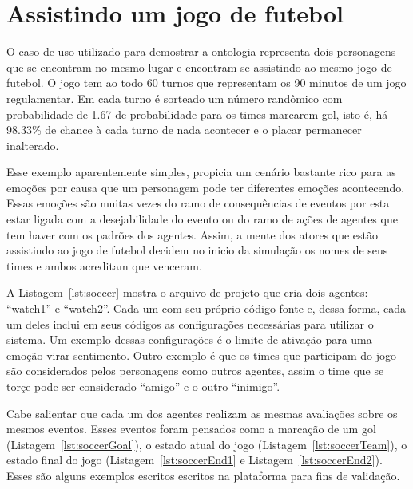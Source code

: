 \section{Assistindo um jogo de futebol} \label{ch:cdu:svc}

O caso de uso utilizado para demostrar a ontologia representa dois personagens
que se encontram no mesmo lugar e encontram-se assistindo ao mesmo jogo de
futebol. O jogo tem ao todo 60 turnos que representam os 90 minutos de um jogo
regulamentar. Em cada turno é sorteado um número randômico com probabilidade
de 1.67 de probabilidade para os times marcarem gol, isto é, há 98.33\% de
chance à cada turno de nada acontecer e o placar permanecer inalterado.

Esse exemplo aparentemente simples, propicia um cenário bastante rico para as
emoções por causa que um personagem pode ter diferentes emoções acontecendo.
Essas emoções são muitas vezes do ramo de consequências de eventos por esta
estar ligada com a desejabilidade do evento ou do ramo de ações de agentes que
tem haver com os padrões dos agentes. Assim, a mente dos atores que estão
assistindo ao jogo de futebol decidem no inicio da simulação os nomes de seus
times e ambos acreditam que venceram.

\begin{center}
    \begin{minipage}{140mm}
	\lstset{linewidth=140mm}
	
    \end{minipage}
\end{center}

A Listagem~\ref{lst:soccer} mostra o arquivo de projeto que cria dois agentes:
``watch1'' e ``watch2''. Cada um com seu próprio código fonte e,
dessa forma, cada um deles inclui em seus códigos as configurações
necessárias para utilizar o sistema. Um exemplo dessas configurações
é o limite de ativação para uma emoção virar sentimento. Outro exemplo é que
os times que participam do jogo são considerados pelos personagens como outros
agentes, assim o time que se torçe pode ser considerado ``amigo'' e o outro
``inimigo''.

Cabe salientar que cada um dos agentes realizam as mesmas avaliações sobre os
mesmos eventos. Esses eventos foram pensados como a marcação de um gol
(Listagem~\ref{lst:soccerGoal}), o estado atual do jogo
(Listagem~\ref{lst:soccerTeam}), o estado final do jogo
(Listagem~\ref{lst:soccerEnd1} e Listagem~\ref{lst:soccerEnd2}).
Esses são alguns exemplos escritos escritos na plataforma \jason para
fins de validação.

